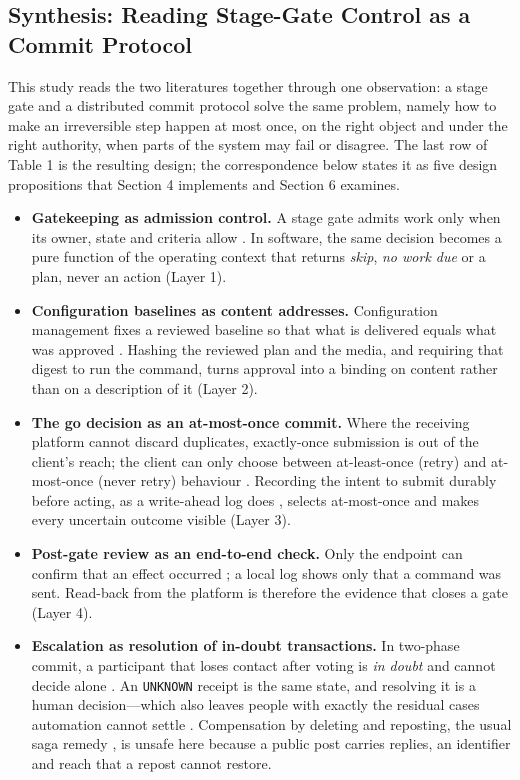 \documentclass[11pt,a4paper]{article}
\theoremstyle{definition}
\begin{document}
\subsection{Synthesis: Reading Stage-Gate Control as a Commit Protocol}
\label{sec:2.4}

This study reads the two literatures together through one observation: a stage gate and a distributed commit protocol solve the same problem, namely how to make an irreversible step happen at most once, on the right object and under the right authority, when parts of the system may fail or disagree. The last row of Table 1 is the resulting design; the correspondence below states it as five design propositions that Section 4 implements and Section 6 examines.

\begin{itemize}[leftmargin=1.8em]
    \item \textbf{Gatekeeping as admission control.} A stage gate admits work only when its owner, state and criteria allow \citep{Cooper1990, Too2014}. In software, the same decision becomes a pure function of the operating context that returns \emph{skip}, \emph{no work due} or a plan, never an action (Layer 1).
    \item \textbf{Configuration baselines as content addresses.} Configuration management fixes a reviewed baseline so that what is delivered equals what was approved \citep{Whyte2016}. Hashing the reviewed plan and the media, and requiring that digest to run the command, turns approval into a binding on content rather than on a description of it (Layer 2).
    \item \textbf{The go decision as an at-most-once commit.} Where the receiving platform cannot discard duplicates, exactly-once submission is out of the client's reach; the client can only choose between at-least-once (retry) and at-most-once (never retry) behaviour \citep{Helland2012, Kleppmann2017}. Recording the intent to submit durably before acting, as a write-ahead log does \citep{gray1992transaction}, selects at-most-once and makes every uncertain outcome visible (Layer 3).
    \item \textbf{Post-gate review as an end-to-end check.} Only the endpoint can confirm that an effect occurred \citep{Saltzer1984}; a local log shows only that a command was sent. Read-back from the platform is therefore the evidence that closes a gate (Layer 4).
    \item \textbf{Escalation as resolution of in-doubt transactions.} In two-phase commit, a participant that loses contact after voting is \emph{in doubt} and cannot decide alone \citep{gray1992transaction}. An \texttt{UNKNOWN} receipt is the same state, and resolving it is a human decision---which also leaves people with exactly the residual cases automation cannot settle \citep{Bainbridge1983}. Compensation by deleting and reposting, the usual saga remedy \citep{GarciaMolina1987}, is unsafe here because a public post carries replies, an identifier and reach that a repost cannot restore.
\end{itemize}
\end{document}
